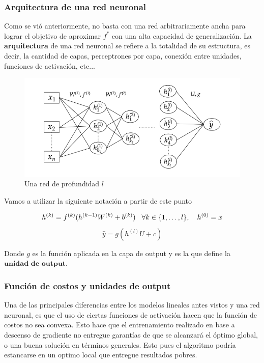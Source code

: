 \subsubsection{Arquitectura de una red neuronal}

Como se vió anteriormente, no basta con una red arbitrariamente ancha para lograr el objetivo de aproximar $f^{*}$ con una alta capacidad de generalización. La \textbf{arquitectura} de una red neuronal se refiere a la totalidad de su estructura, es decir, la cantidad de capas, perceptrones por capa, conexión entre unidades, funciones de activación, etc... 

\begin{figure}[H]
	\centering
	\includegraphics[scale=.5]{img/cap7_red}
	\caption{Una red de profundidad $l$}
\end{figure}

Vamos a utilizar la siguiente notación a partir de este punto 

\begin{equation}
	h^{(k)} = f^{(k)}(h^{(k-1)}W^{(k)} + b^{(k)}) \hspace{0.3cm} \forall k \in \{1 ,\dots, l\}, \quad h^{(0)}=x
	\end{equation}
	\begin{equation}
	\hat{y} = g(h^{(l)}U + c)
\end{equation}
	
Donde $g$ es la función aplicada en la capa de output y es la que define la $\textbf{unidad de output}.$

\subsubsection{Función de costos y unidades de output}

Una de las principales diferencias entre los modelos lineales antes vistos y una red neuronal, es que el uso de ciertas funciones de activaci\'on hacen que la funci\'on de costos no sea convexa. Esto hace que el entrenamiento realizado en base a descenso de gradiente no entregue garant\'ias de que se alcanzar\'a el \'optimo global, o una buena solución en términos generales. Esto pues el algoritmo podría estancarse en un optimo local que entregue resultados pobres. 

